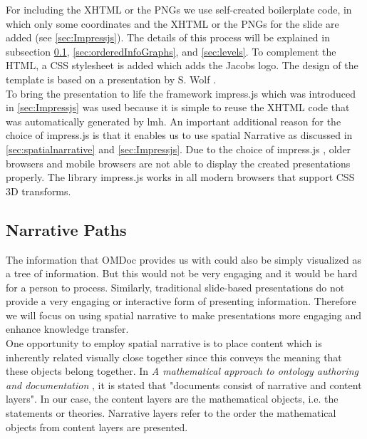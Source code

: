 \documentclass[twoside, 12pt]{article}
\begin{document}
For including the XHTML or the PNGs we use self-created boilerplate code, in which only some coordinates and the XHTML or the PNGs for the slide are added (see \autoref{sec:Impressjs}). The details of this process will be explained in subsection \ref{sec:narrativePaths}, \ref{sec:orderedInfoGraphs}, and \ref{sec:levels}. To complement the HTML, a CSS stylesheet is added which adds the Jacobs logo. The design of the template is based on a presentation by S. Wolf \cite{Wolf:npentrel15}.\\

To bring the presentation to life the framework impress.js which was introduced in \autoref{sec:Impressjs} was used because it is simple to reuse the XHTML code that was automatically generated by lmh. An important additional reason for the choice of impress.js is that it enables us to use spatial Narrative as discussed in \autoref{sec:spatialnarrative} and \autoref{sec:Impressjs}. Due to the choice of impress.js \cite{JSImpress:npentrel14}, older browsers and mobile browsers are not able to display the created presentations properly. The library impress.js works in all modern browsers that support CSS 3D transforms.

\subsection{Narrative Paths}
\label{sec:narrativePaths}

The information that OMDoc provides us with could also be simply visualized as a tree of information. But this would not be very engaging and it would be hard for a person to process. Similarly, traditional slide-based presentations do not provide a very engaging or interactive form of presenting information. Therefore we will focus on using spatial narrative to make presentations more engaging and enhance knowledge transfer.\\ 

One opportunity to employ spatial narrative is to place content which is inherently related visually close together since this conveys the meaning that these objects belong together. In \textit{A mathematical approach to ontology authoring and documentation} \cite{LK:MathOntoAuthDoc09}, it is stated that "documents consist of narrative and content layers". In our case, the content layers are the mathematical objects, i.e. the statements or theories. Narrative layers refer to the order the mathematical objects from content layers are presented.\\
\end{document}
